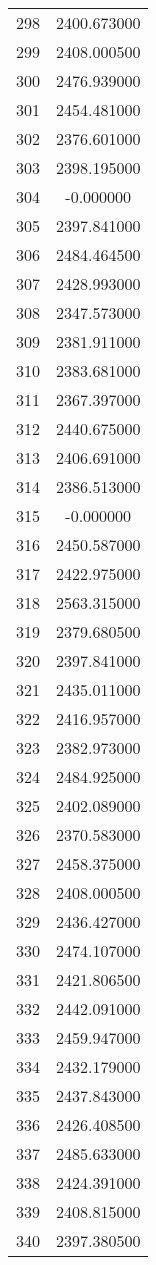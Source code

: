 \documentclass[12pt]{article}
\begin{document}
\begin{longtable}{@{}cc@{}}
298 & 2400.673000 \\
299 & 2408.000500 \\
300 & 2476.939000 \\
301 & 2454.481000 \\
302 & 2376.601000 \\
303 & 2398.195000 \\
304 & -0.000000 \\
305 & 2397.841000 \\
306 & 2484.464500 \\
307 & 2428.993000 \\
308 & 2347.573000 \\
309 & 2381.911000 \\
310 & 2383.681000 \\
311 & 2367.397000 \\
312 & 2440.675000 \\
313 & 2406.691000 \\
314 & 2386.513000 \\
315 & -0.000000 \\
316 & 2450.587000 \\
317 & 2422.975000 \\
318 & 2563.315000 \\
319 & 2379.680500 \\
320 & 2397.841000 \\
321 & 2435.011000 \\
322 & 2416.957000 \\
323 & 2382.973000 \\
324 & 2484.925000 \\
325 & 2402.089000 \\
326 & 2370.583000 \\
327 & 2458.375000 \\
328 & 2408.000500 \\
329 & 2436.427000 \\
330 & 2474.107000 \\
331 & 2421.806500 \\
332 & 2442.091000 \\
333 & 2459.947000 \\
334 & 2432.179000 \\
335 & 2437.843000 \\
336 & 2426.408500 \\
337 & 2485.633000 \\
338 & 2424.391000 \\
339 & 2408.815000 \\
340 & 2397.380500 \\

\end{longtable}
\end{document}
